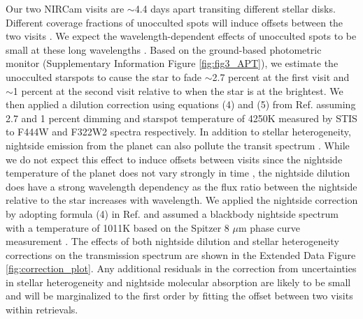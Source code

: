 \documentclass[sn-standardnature]{sn-jnl}%
\begin{document}
Our two NIRCam visits are $\sim$4.4 days apart transiting different stellar disks. Different coverage fractions of unocculted spots will induce offsets between the two visits \cite{rackham_transit_2018}. We expect the wavelength-dependent effects of unocculted spots to be small at these long wavelengths \cite{fu_water_2022}. Based on the ground-based photometric monitor (Supplementary Information Figure \ref{fig:fig3_APT}), we estimate the unocculted starspots to cause the star to fade $\sim$2.7 percent at the first visit and $\sim$1 percent at the second visit relative to when the star is at the brightest. We then applied a dilution correction using equations (4) and (5) from Ref. \cite{sing_hubble_2011} assuming 2.7 and 1 percent dimming and starspot temperature of 4250K measured by STIS \cite{pont_prevalence_2013} to F444W and F322W2 spectra respectively. In addition to stellar heterogeneity, nightside emission from the planet can also pollute the transit spectrum \cite{kipping_nightside_2010}. While we do not expect this effect to induce offsets between visits since the nightside temperature of the planet does not vary strongly in time \cite{komacek_temporal_2019}, the nightside dilution does have a strong wavelength dependency as the flux ratio between the nightside relative to the star increases with wavelength. We applied the nightside correction by adopting formula (4) in Ref. \cite{kipping_nightside_2010} and assumed a blackbody nightside spectrum with a temperature of 1011K based on the Spitzer 8 $\mu$m phase curve measurement \cite{knutson_multiwavelength_2008}. The effects of both nightside dilution and stellar heterogeneity corrections on the transmission spectrum are shown in the Extended Data Figure \ref{fig:correction_plot}. Any additional residuals in the correction from uncertainties in stellar heterogeneity and nightside molecular absorption are likely to be small and will be marginalized to the first order by fitting the offset between two visits within retrievals. \\
\end{document}
